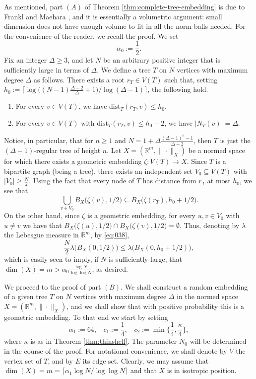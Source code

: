 \documentclass[11pt,leqno]{amsart}
\theoremstyle{remark}
\theoremstyle{plain}
\begin{document}
As mentioned, part $(A)$ of Theorem \ref{thm:complete-tree-embedding} is due to Frankl and Maehara \cite{FM86}, and it is essentially a volumetric argument: small dimension does not have enough volume to fit in all the norm balls needed. For the convenience of the reader, we recall the proof. We set
\begin{equation} \label{pa.eq.1}
\alpha_0:= \frac12.
\end{equation}
Fix an integer $\Delta\geqslant 3$, and let $N$ be an arbitrary positive integer that is sufficiently large in terms of $\Delta$. We define a tree $T$ on $N$ vertices with maximum degree $\Delta$ as follows. There exists a root $r_T\in V(T)$ such that, setting $h_0:=\big\lceil \log\big((N-1)\frac{\Delta-2}{\Delta}+1\big)/\log(\Delta-1)\big\rceil$, the following hold.
\begin{enumerate}
\item[$\bullet$] For every $v\in V(T)$, we have $\mathrm{dist}_T(r_T,v)\leqslant h_0$.
\item[$\bullet$] For every $v\in V(T)$ with $\mathrm{dist}_T(r_T,v)\leqslant h_0-2$, we have $|N_T(v)|=\Delta$.
\end{enumerate}
Notice, in particular, that for $n \geqslant 1$ and $N = 1 + \Delta \frac{(\Delta-1)^{n}-1}{\Delta-2}$, then $T$ is just the $(\Delta-1)$-regular tree of height $n$. Let $X=(\mathbb{R}^m,\|\cdot\|_X)$ be a normed space for which there exists a geometric embedding $\zeta\colon V(T)\to X$. Since $T$ is a bipartite graph (being a tree), there exists an independent set $V_0\subseteq V(T)$ with $|V_0|\geqslant\frac{N}{2}$. Using the fact that every node of $T$ has distance from $r_T$ at most $h_0$, we see that
\begin{equation}\label{eq:038}
\bigcup_{v\in V_0}B_X\big(\zeta(v),1/2\big) \subseteq B_X\big(\zeta(r_T), h_0+1/2\big).
\end{equation}
On the other hand, since $\zeta$ is a geometric embedding, for every $u,v\in V_0$ with $u\neq v$ we have that $B_X\big(\zeta(u),1/2\big)\cap B_X\big(\zeta(v),1/2\big)=\emptyset$. Thus, denoting by $\lambda$ the Lebesgue measure in $\mathbb{R}^m$, by \eqref{eq:038},
\[ \frac{N}{2}\lambda\big(B_X(0,1/2)\big) \leqslant \lambda\big(B_X(0,h_0+1/2)\big), \]
which is easily seen to imply, if $N$ is sufficiently large, that $\dim(X)=m > \alpha_0 \frac{\log N}{\log\log N}$, as desired.

We proceed to the proof of part $(B)$. We shall construct a random embedding of a given tree $T$ on $N$ vertices
with maximum degree $\Delta$ in the normed space $X=(\mathbb{R}^m,\|\cdot\|_X)$, and we shall show that with positive probability
this is a geometric embedding. To that end we start by setting
\begin{equation} \label{eq:001}
\alpha_1:=64, \ \ \ \ c_1:=\frac{1}{4}, \ \ \ \ c_2:=\min\Big\{\frac{1}{4},\frac{\kappa}{4}\Big\},
\end{equation}
where $\kappa$ is as in Theorem \ref{thm:thinshell}. The parameter $N_0$ will be determined in the course
of the proof. For notational convenience, we shall denote by $V$ the vertex set of $T$, and by $E$ its edge set.
Clearly, we may assume that $\dim(X)=m= \big\lceil \alpha_1 \log N/\log\log N \big\rceil$ and that $X$ is in isotropic position.
\end{document}
